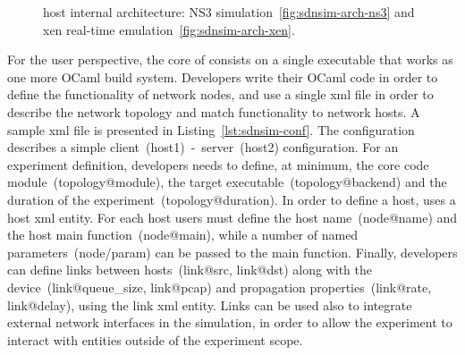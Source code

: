 \begin{figure}
\centering
{}
\caption{\sdnsim host internal architecture: NS3
  simulation~\ref{fig:sdnsim-arch-ns3} and xen real-time
  emulation~\ref{fig:sdnsim-arch-xen}.}
\label{fig:sdnsim-arch}
\end{figure}

For the user perspective, the core of \sdnsim consists on a single executable
that works as one more OCaml build system. Developers write their OCaml code in
order to define the functionality of network nodes, and use a single xml file in
order to describe the network topology and match functionality to network hosts.
A sample xml file is presented in Listing~\ref{lst:sdnsim-conf}. The
configuration describes a simple client~(host1)~-~server~(host2) configuration.
For an experiment definition, developers needs to define, at minimum,  the core
code module~(topology@module), the target executable~(topology@backend) and the
duration of the experiment~(topology@duration). In order to define a host,
\sdnsim uses a host xml entity. For each host users must define the host
name~(node@name) and the host main function~(node@main), while a number of named
parameters~(node/param) can be passed to the main function. Finally, developers
can define links between hosts~(link@src, link@dst) along with the
device~(link@queue\_size, link@pcap) and propagation properties~(link@rate,
link@delay), using the link xml entity. Links can be used also to integrate
external network interfaces in the simulation, in order to allow the experiment to
interact with entities outside of the experiment scope.

